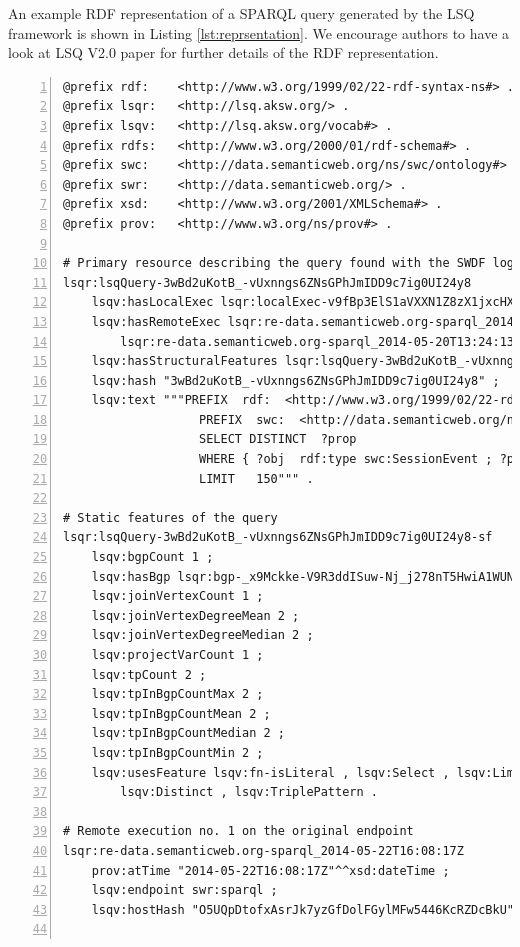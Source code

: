 An example RDF representation of a SPARQL query generated by the LSQ framework is shown in Listing \ref{lst:reprsentation}. We encourage authors to have a look at LSQ V2.0 paper \cite{stadleralsq} for further details of the RDF representation.  

\begin{lstlisting}[caption = {An example LSQ/RDF representation of a SPARQL query in Turtle syntax \cite{stadleralsq}},label = {lst:reprsentation},style=lst,basicstyle={\scriptsize\ttfamily},language=ttl,frame={single},breaklines=true,stepnumber=1,float=*, numbers=left]
@prefix rdf:	<http://www.w3.org/1999/02/22-rdf-syntax-ns#> .
@prefix lsqr:	<http://lsq.aksw.org/> .
@prefix lsqv:	<http://lsq.aksw.org/vocab#> .
@prefix rdfs:	<http://www.w3.org/2000/01/rdf-schema#> .
@prefix swc:	<http://data.semanticweb.org/ns/swc/ontology#> .
@prefix swr:	<http://data.semanticweb.org/> .
@prefix xsd:	<http://www.w3.org/2001/XMLSchema#> .
@prefix prov:	<http://www.w3.org/ns/prov#> .

# Primary resource describing the query found with the SWDF logs
lsqr:lsqQuery-3wBd2uKotB_-vUxnngs6ZNsGPhJmIDD9c7ig0UI24y8	
	lsqv:hasLocalExec lsqr:localExec-v9fBp3ElS1aVXXN1Z8zX1jxcHX3iy-axTgRrU2c7NY8 ;
	lsqv:hasRemoteExec lsqr:re-data.semanticweb.org-sparql_2014-05-22T16:08:17Z ,
		lsqr:re-data.semanticweb.org-sparql_2014-05-20T13:24:13Z ;
	lsqv:hasStructuralFeatures lsqr:lsqQuery-3wBd2uKotB_-vUxnngs6ZNsGPhJmIDD9c7ig0UI24y8-sf ;
	lsqv:hash "3wBd2uKotB_-vUxnngs6ZNsGPhJmIDD9c7ig0UI24y8" ;
	lsqv:text """PREFIX  rdf:  <http://www.w3.org/1999/02/22-rdf-syntax-ns#>
	               PREFIX  swc:  <http://data.semanticweb.org/ns/swc/ontology#>
	               SELECT DISTINCT  ?prop
	               WHERE { ?obj  rdf:type swc:SessionEvent ; ?prop ?targetObj FILTER isLiteral(?targetObj)  }
	               LIMIT   150""" .

# Static features of the query
lsqr:lsqQuery-3wBd2uKotB_-vUxnngs6ZNsGPhJmIDD9c7ig0UI24y8-sf	
	lsqv:bgpCount 1 ;
	lsqv:hasBgp lsqr:bgp-_x9Mckke-V9R3ddISuw-Nj_j278nT5HwiA1WUNk7tgY ;
	lsqv:joinVertexCount 1 ;
	lsqv:joinVertexDegreeMean 2 ;
	lsqv:joinVertexDegreeMedian 2 ;
	lsqv:projectVarCount 1 ;
	lsqv:tpCount 2 ;
	lsqv:tpInBgpCountMax 2 ;
	lsqv:tpInBgpCountMean 2 ;
	lsqv:tpInBgpCountMedian 2 ;
	lsqv:tpInBgpCountMin 2 ;
	lsqv:usesFeature lsqv:fn-isLiteral , lsqv:Select , lsqv:Limit , lsqv:Functions , lsqv:Group , lsqv:Filter , 
		lsqv:Distinct , lsqv:TriplePattern .              

# Remote execution no. 1 on the original endpoint
lsqr:re-data.semanticweb.org-sparql_2014-05-22T16:08:17Z	
	prov:atTime "2014-05-22T16:08:17Z"^^xsd:dateTime ;
	lsqv:endpoint swr:sparql ;
	lsqv:hostHash "O5UQpDtofxAsrJk7yzGfDolFGylMFw5446KcRZDcBkU" .


\end{lstlisting}
